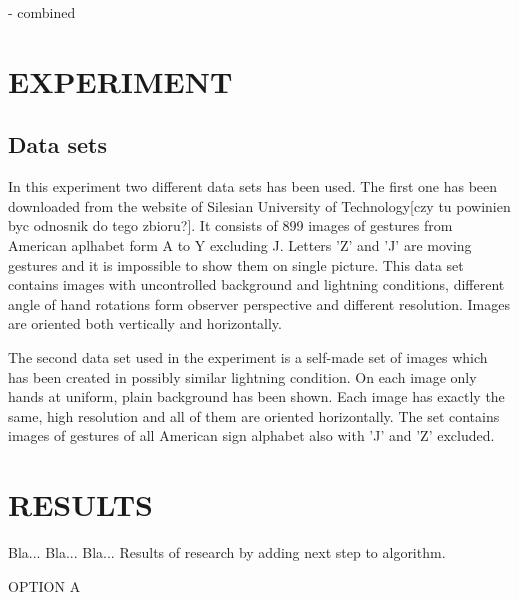 \documentclass[11pt,a4paper]{article}
\begin{document}
- combined


\section{EXPERIMENT}

\subsection{Data sets}
	In this experiment two different data sets has been used. The first one has been downloaded from the website of Silesian University of Technology[czy tu powinien byc odnosnik do tego zbioru?]. It consists of 899 images of gestures from American aplhabet form A to Y excluding J. Letters 'Z' and 'J' are moving gestures and it is impossible to show them on single picture. This data set contains images with uncontrolled background and lightning conditions, different angle of hand rotations form observer perspective and different resolution. Images are oriented both vertically and horizontally.
	
	The second data set used in the experiment is a self-made set of images which has been created in possibly similar lightning condition. On each image only hands at uniform, plain background has been shown. Each image has exactly the same, high resolution and all of them are oriented horizontally. The set contains images of gestures of all American sign alphabet also with 'J' and 'Z' excluded.



\section{RESULTS}

Bla... Bla... Bla... Results of research by adding next step to algorithm.

OPTION A 
\end{document}
